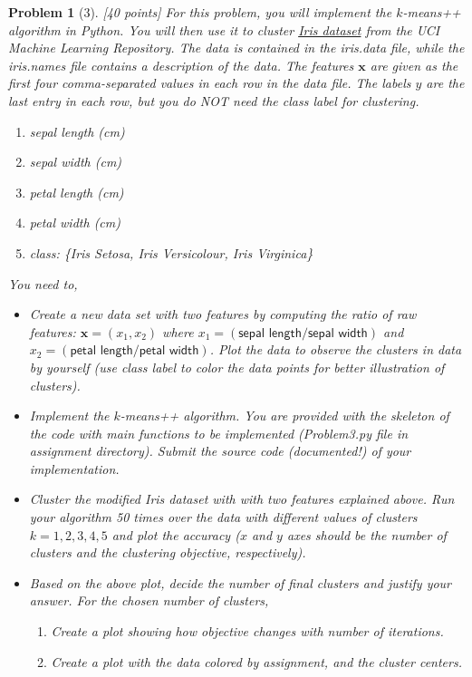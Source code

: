 \documentclass[11pt]{article}
\theoremstyle{quest}
\newtheorem*{problem}{Problem}
\begin{document}
\begin{problem}[3] [40 points]
For this problem, you will implement the $k$-means++ algorithm in Python. You will then use it to cluster \href{https://archive.ics.uci.edu/ml/datasets/iris}{Iris dataset} from the UCI Machine Learning Repository. The data is contained in the \textsf{iris.data} file, while the \textsf{iris.names} file contains a description of the data. The features $\bm{x}$ are given as the first four comma-separated values in each row in the data file. The labels $y$ are the last entry in each row, but you do NOT need the class label for clustering.
\begin{enumerate}
    \item \textsf{sepal length} (cm)
    \item \textsf{sepal width} (cm)
    \item \textsf{petal length} (cm)
    \item \textsf{petal width} (cm)
    \item \textsf{class:} \{Iris Setosa, Iris Versicolour, Iris Virginica\}
\end{enumerate}

You need to,
\begin{itemize}
    \item Create a new data set with two features by computing the ratio of raw features: $\bm{x} = (x_1, x_2)$ where $x_1 = (\textsf{sepal length}/\textsf{sepal width})$ and $x_2 = (\textsf{petal length}/\textsf{petal width})$. Plot the data to observe the clusters in data by yourself (use class label to color the data points for better illustration of clusters).
    \item Implement the $k$-means++ algorithm. You are provided with the skeleton of the code with main functions to be implemented (\textsf{Problem3.py} file in assignment directory). Submit the source code (documented!) of your implementation.
    \item Cluster the modified Iris dataset with with two features explained above. Run your algorithm 50 times over the data with different values of clusters $k = 1,2,3,4,5$ and plot the accuracy ($x$ and $y$ axes should be the number of clusters and the clustering objective, respectively).
    \item Based on the above plot, decide the number of final clusters and justify your answer. For the chosen number of clusters,
    \begin{enumerate}
        \item Create a plot showing how objective changes with number of iterations.
        \item Create a plot with the data colored by assignment, and the cluster centers.
    \end{enumerate}
\end{itemize}
\end{problem}
\end{document}
